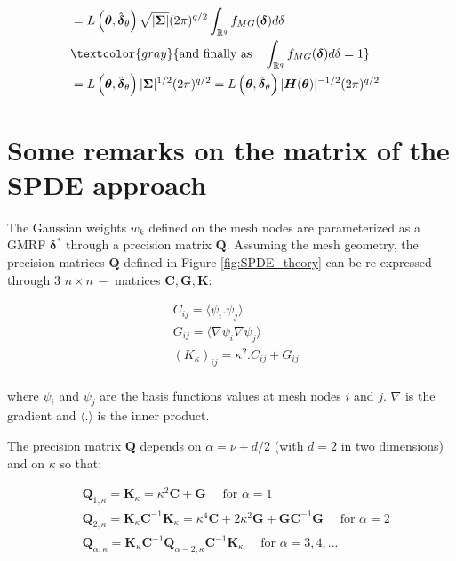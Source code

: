 $$\begin{aligned}
& = L\left(\boldsymbol{\theta}, \hat{\boldsymbol{\delta}}_{\theta}\right) \sqrt{|\boldsymbol{\Sigma}|} (2 \pi)^{q / 2} \int_{\mathbb{R}^{q}} f_{MG}(\boldsymbol{\delta}) d \delta \\
& \textcolor{gray}{\text{and finally as} \quad \int_{\mathbb{R}^{q}} f_{MG}(\boldsymbol{\delta}) d \delta = 1} \\
& = L\left(\boldsymbol{\theta}, \hat{\boldsymbol{\delta}}_{\theta}\right) |\boldsymbol{\Sigma}|^{1/2} (2 \pi)^{q / 2} =  L\left(\boldsymbol{\theta}, \hat{\boldsymbol{\delta}}_{\theta}\right) |\boldsymbol{H}(\boldsymbol{\theta})|^{-1/2} (2 \pi)^{q / 2} \quad \small \\
\end{aligned}
$$

\section{Some remarks on the matrix of the SPDE approach}\label{appendix:SPDE}

The Gaussian weights $w_k$ defined on the mesh nodes are parameterized as a GMRF $\boldsymbol{\delta}^*$ through a precision matrix $\mathbf{Q}$. Assuming the mesh geometry, the precision matrices $\mathbf{Q}$ defined in Figure \ref{fig:SPDE_theory} can be re-expressed through 3 $n \times n \, -$ matrices $\mathbf{C},\mathbf{G},\mathbf{K}$:

$$
\begin{aligned}
& C_{ij} = \langle \psi_i . \psi_j \rangle \\
& G_{ij} = \langle \nabla\psi_i \nabla \psi_j \rangle \\
& (K_{\kappa})_{ij} = \kappa^2 . C_{ij} + G_{ij} \\
\end{aligned}
$$

where $\psi_i$ and $\psi_j$ are the basis functions values at mesh nodes $i$ and $j$. $\nabla$ is the gradient and $\langle . \rangle$ is the inner product.

The precision matrix $\mathbf{Q}$ depends on $\alpha = \nu + d / 2$  (with $d = 2$ in two dimensions) and on $\kappa$ so that:

$$
\begin{aligned}
& \mathbf{Q}_{1,\kappa}=\mathbf{K}_\kappa=\kappa^2\mathbf{C}+\mathbf{G} \quad \text{ for } \alpha=1\\
& \mathbf{Q}_{2,\kappa}= \mathbf{K}_\kappa \mathbf{C}^{-1} \mathbf{K}_\kappa = \kappa^4 \mathbf{C} + 2\kappa^2 \mathbf{G} + \mathbf{GC}^{-1}\mathbf{G}   \quad \text{ for } \alpha=2 \\
& \mathbf{Q}_{\alpha,\kappa}= \mathbf{K}_\kappa \mathbf{C}^{-1} \mathbf{Q}_{\alpha-2,\kappa} \mathbf{C}^{-1} \mathbf{K}_\kappa \quad \text{ for } \alpha=3,4,...
\end{aligned}
$$

